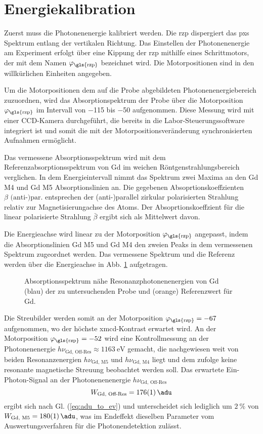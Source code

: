 \section{Energiekalibration}
Zuerst muss die Photonenenergie kalibriert werden. Die \gls{rzp} dispergiert das \gls{pxs} Spektrum entlang der vertikalen Richtung. Das Einstellen der Photonenenergie am Experiment erfolgt über eine Kippung der \gls{rzp} mithilfe eines Schrittmotors, der mit dem Namen $\varphi_\text{\gls{rzp}}$ bezeichnet wird. Die Motorpositionen sind in den willkürlichen Einheiten angegeben.

\noindent
Um die Motorpositionen dem auf die Probe abgebildeten Photonenenergiebereich zuzuordnen, wird das Absorptionspektrum der Probe über die Motorposition $\varphi_\text{\gls{rzp}}$ im Intervall von \num{-115} bis \num{-50} aufgenommen. Diese Messung wird mit einer CCD-Kamera durchgeführt, die bereits in die Labor-Steuerungssoftware integriert ist und somit die mit der Motorpositionsveränderung synchronisierten Aufnahmen ermöglicht.

\noindent
Das vermessene Absorptionsspektrum wird mit dem Referenzabsorptionsspektrum von Gd im weichen Röntgenstrahlungsbereich verglichen. In dem Energieintervall nimmt das Spektrum zwei Maxima an den Gd M4 und Gd M5 Absorptionslinien an. Die gegebenen \cite[Abb. 2]{prieto-x-ray-2005} Absoprtionskoeffzienten $\beta \text{ (anti-)par.}$ entsprechen der (anti-)parallel zirkular polarisierten Strahlung relativ zur Magnetisierungachse des Atoms. Der Absoprtionskoeffzient für die linear polarisierte Strahlung $\bar{\beta}$ ergibt sich als Mittelwert davon.

\noindent
Die Energieachse wird linear zu der Motorposition $\varphi_\text{\gls{rzp}}$ angepasst, indem die Absorptionslinien Gd M5 und Gd M4 den zweien Peaks in dem vermessenen Spektrum zugeordnet werden. Das vermessene Spektrum und die Referenz werden über die Energieachse in Abb. \ref{fig:rzp_phi_ev} aufgetragen.
\begin{figure}[H]
    \centering
    
    \caption{Absorptionsspektrum nähe Resonanzphotonenenergien von Gd (blau) der zu untersuchenden Probe und (orange) Referenzwert für Gd.}
    \label{fig:rzp_phi_ev}
\end{figure}
\noindent
Die Streubilder werden somit an der Motorposition $\varphi_\text{\gls{rzp}} = \num{-67}$ aufgenommen, wo der höchste \gls{xmcd}-Kontrast erwartet wird. An der Motorposition $\varphi_\text{\gls{rzp}} = \num{-52}$ wird eine Kontrollmessung an der Photonenenergie $h\nu_\text{Gd, Off-Res} \approx \SI{1163}{\eV}$ gemacht, die nachgewiesen weit von beiden Resonanzenergien $h\nu_\text{Gd, M5}$ und $h\nu_\text{Gd, M4}$ liegt und dem zufolge keine resonante magnetische Streuung beobachtet werden soll. Das erwartete Ein-Photon-Signal an der Photonenenenergie $h\nu_\text{Gd, Off-Res}$ 
\begin{equation}
    W_\text{Gd, Off-Res} = \SI{176(1)}{\adu}
\end{equation}
ergibt sich nach Gl. (\ref{eq:adu_to_ev}) und unterscheidet sich lediglich um $\SI{2}{\percent}$ von $W_\text{Gd, M5} = \SI{180(1)}{\adu}$, was im Endeffekt dieselben Parameter vom Auswertungsverfahren für die Photonendetektion zulässt.

